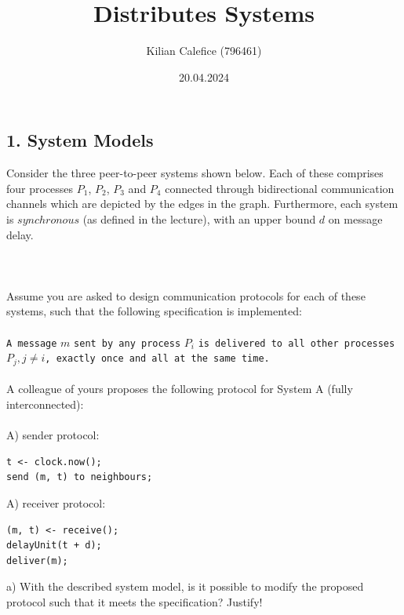 \documentclass{article}
\title{Distributes Systems}
\author{Kilian Calefice (796461)}
\date{20.04.2024}
\begin{document}
\maketitle

\subsection*{1. System Models}

Consider the three peer-to-peer systems shown below. Each of these comprises four processes $P_1$, $P_2$,
$P_3$ and $P_4$ connected through bidirectional communication channels which are depicted by the edges
in the graph. Furthermore, each system is $synchronous$ (as defined in the lecture), with an upper bound
$d$ on message delay.\\
\\
\noindent{}\\
\\
Assume you are asked to design communication protocols for each of these systems, such that the following
specification is implemented:\\
\\
\texttt{A message} $m$ \texttt{sent by any process} $P_i$ \texttt{is delivered to all other processes}
$P_j, j \neq i$\texttt{, exactly once and all at the same time.}\\
\\
A colleague of yours proposes the following protocol for System A (fully interconnected):\\
\\
A) sender protocol:
\begin{lstlisting}[style=CStyle]
t <- clock.now();
send (m, t) to neighbours;
\end{lstlisting}
A) receiver protocol:
\begin{lstlisting}[style=CStyle]
(m, t) <- receive();
delayUnit(t + d);
deliver(m);
\end{lstlisting}
a) With the described system model, is it possible to modify the proposed protocol such that it meets the
specification? Justify!\\
\\
\end{document}
